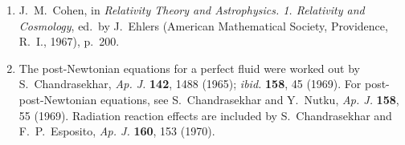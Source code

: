 \begin{enumerate}
  \item {}\label{ch9-ref-10}
  J.~M.~Cohen, in \emph{Relativity Theory and Astrophysics. 1. Relativity
  and Cosmology}, ed.\ by J.~Ehlers (American Mathematical Society,
  Providence, R.~I., 1967), p.~200.

  \item {}\label{ch9-ref-11}
  The post-Newtonian equations for a perfect fluid were worked out by
  S.~Chandrasekhar, \emph{Ap. J.} \textbf{142}, 1488 (1965);
  \emph{ibid.} \textbf{158}, 45 (1969). For post-post-Newtonian equations,
  see S.~Chandrasekhar and Y.~Nutku, \emph{Ap. J.} \textbf{158}, 55 (1969).
  Radiation reaction effects are included by S.~Chandrasekhar and
  F.~P.~Esposito, \emph{Ap. J.} \textbf{160}, 153 (1970).
\end{enumerate}
\endgroup
